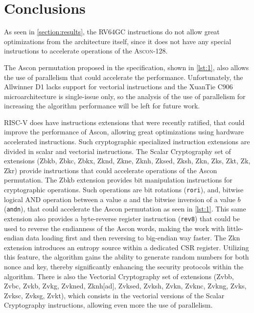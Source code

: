 \documentclass[11pt,twoside]{article}
\begin{document}
\section{Conclusions}

As seen in \cref{section:results}, the \textsf{RV64GC} instructions do not allow great optimizations from the architecture itself, since it does not have any special instructions to accelerate operations of the \textsc{Ascon-128}.

The Ascon permutation proposed in the specification, shown in \cref{lst:1}, also allows the use of parallelism that could accelerate the performance. Unfortunately, the Allwinner D1 lacks support for vectorial instructions and the XuanTie C906 microarchitecture is single-issue only, so the analysis of the use of parallelism for increasing the algorithm performance will be left for future work.

RISC-V does have instructions extensions that were recently ratified, that could improve the performance of Ascon, allowing great optimizations using hardware accelerated instructions. Such cryptographic specialized instruction extensions are divided in scalar \cite{riscvCryptoVol1} and vectorial \cite{riscvCryptoVol2} instructions. The Scalar Cryptography set of extensions (\textsf{Zbkb}, \textsf{Zbkc}, \textsf{Zbkx}, \textsf{Zknd}, \textsf{Zkne}, \textsf{Zknh}, \textsf{Zksed}, \textsf{Zksh}, \textsf{Zkn}, \textsf{Zks}, \textsf{Zkt}, \textsf{Zk}, \textsf{Zkr}) provide instructions that could accelerate operations of the Ascon permutation. The \textsf{Zbkb} extension provides bit manipulation instructions for cryptographic operations. Such operations are bit rotations (\texttt{rori}), and, bitwise logical AND operation between a value $a$ and the bitwise inversion of a value $b$ (\texttt{andn}), that could accelerate the Ascon permutation as seen in \cref{lst:1}. This same extension also provides a byte-reverse register instruction (\texttt{rev8}) that could be used to reverse the endianness of the Ascon words, making the work with little-endian data loading first and then reversing to big-endian way faster. The \textsf{Zkn} extension introduces an entropy source within a dedicated CSR register. Utilizing this feature, the algorithm gains the ability to generate random numbers for both nonce and key, thereby significantly enhancing the security protocols within the algorithm. There is also the Vectorial Cryptography set of extensions (\textsf{Zvbb}, \textsf{Zvbc}, \textsf{Zvkb}, \textsf{Zvkg}, \textsf{Zvkned}, \textsf{Zknh[ad]}, \textsf{Zvksed}, \textsf{Zvksh}, \textsf{Zvkn}, \textsf{Zvknc}, \textsf{Zvkng}, \textsf{Zvks}, \textsf{Zvksc}, \textsf{Zvksg}, \textsf{Zvkt}), which consists in the vectorial versions of the Scalar Cryptography instructions, allowing even more the use of parallelism.

\printbibliography
\end{document}

